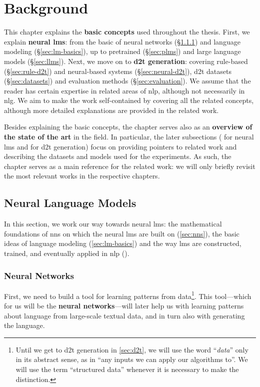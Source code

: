 
\chapter{Background}
\label{chap:background}

This chapter explains the \textbf{basic concepts} used throughout the thesis. First, we explain \textbf{neural \acp{lm}}: from the basic of neural networks (§\ref{sec:nns}) and language modeling (§\ref{sec:lm-basics}), up to pretrained (§\ref{sec:plms}) and large language models (§\ref{sec:llms}). Next, we move on to \textbf{\ac{d2t} generation}: covering rule-based (§\ref{sec:rule-d2t}) and neural-based systems (§\ref{sec:neural-d2t}), \ac{d2t} datasets (§\ref{sec:datasets}) and evaluation methods (§\ref{sec:evaluation}). We assume that the reader has certain expertise in related areas of \ac{nlp}, although not necessarily in \ac{nlg}. We aim to make the work self-contained by covering all the related concepts, although more detailed explanations are provided in the related work.

Besides explaining the basic concepts, the chapter serves also as an \textbf{overview of the state of the art} in the field. In particular, the later subsections ( for neural \acp{lm} and  for \ac{d2t} generation) focus on providing pointers to related work and describing the datasets and models used for the experiments. As such, the chapter serves as a main reference for the related work: we will only briefly revisit the most relevant works in the respective chapters.


\section{Neural Language Models}
\label{sec:lms}
In this section, we work our way towards neural \acp{lm}: the mathematical foundations of \acp{nn} on which the neural \acp{lm} are built on (\autoref{sec:nns}), the basic ideas of language modeling (\autoref{sec:lm-basics}) and the way \acp{lm} are constructed, trained, and eventually applied in \ac{nlp} ().

\subsection{Neural Networks}
\label{sec:nns}
First, we need to build a tool for learning patterns from data\footnote{Until we get to \ac{d2t} generation in \autoref{sec:d2t}, we will use the word ``\textit{data}'' only in its abstract sense, as in ``any inputs we can apply our algorithms to''. We will use the term ``structured data'' whenever it is necessary to make the distinction.}. This tool---which for us will be the \textbf{neural networks}---will later help us with learning patterns about language from large-scale textual data, and in turn also with generating the language.

